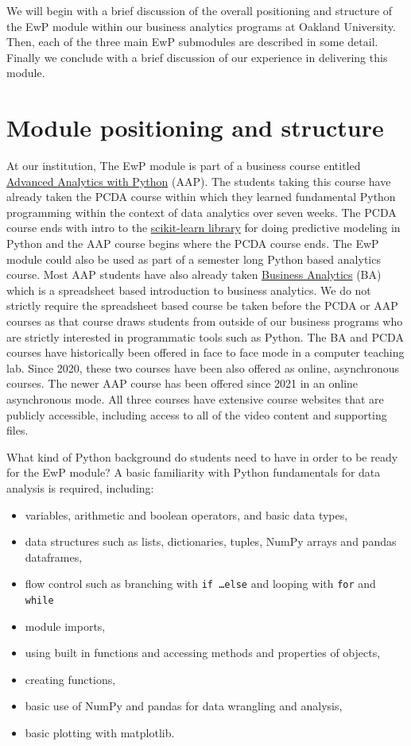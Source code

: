\documentclass[ited,blindrev]{informs3}              %
\begin{document}
We will begin with a brief discussion of the overall positioning and structure of the EwP module within our business analytics programs at Oakland University. Then, each of the three main EwP submodules are described in some detail. Finally we conclude with a brief discussion of our experience in delivering this module.

\section{Module positioning and structure}

At our institution, The EwP module is part of a business course entitled  \href{http://www.sba.oakland.edu/faculty/isken/courses/mis6900}{Advanced Analytics with Python} (AAP). The students taking this course have already taken the PCDA course within which they learned fundamental Python programming within the context of data analytics over seven weeks. The PCDA course ends with intro to the \href{https://scikit-learn.org/stable/index.html}{scikit-learn library} for doing predictive modeling in Python and the AAP course begins where the PCDA course ends. The EwP module could also be used as part of a semester long Python based analytics course. Most AAP students have also already taken   \href{http://www.sba.oakland.edu/faculty/isken/courses/mis5460}{Business Analytics} (BA) which is a spreadsheet based introduction to business analytics. We do not strictly require the spreadsheet based course be taken before the PCDA or AAP courses as that course draws students from outside of our business programs who are strictly interested in programmatic tools such as Python. The BA and PCDA courses have historically been offered in face to face mode in a computer teaching lab. Since 2020, these two courses have been also offered as online, asynchronous courses. The newer AAP course has been offered since 2021 in an online asynchronous mode. All three courses have extensive course websites that are publicly accessible, including access to all of the video content and supporting files. 

What kind of Python background do students need to have in order to be ready for the EwP module? A basic familiarity with Python fundamentals for data analysis is required, including:

\begin{itemize}
	\item variables, arithmetic and boolean operators, and basic data types,
	\item data structures such as lists, dictionaries, tuples, NumPy arrays and pandas dataframes,
	\item flow control such as branching with \texttt{if \ldots else} and looping with \texttt{for} and \texttt{while}
	\item module imports,
	\item using built in functions and accessing methods and properties of objects,
	\item creating functions,
	\item basic use of NumPy and pandas for data wrangling and analysis,
	\item basic plotting with matplotlib.
\end{itemize}
\end{document}

